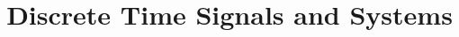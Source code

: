 \documentclass[twoside,final]{hcmut-report}
\title{Discrete Time Signals and Systems}
\begin{document}
\coverpage
\tableofcontents
\clearpage



\clearpage

\clearpage

\clearpage

\clearpage

\clearpage

\clearpage

\clearpage

\clearpage

\clearpage



\end{document}

